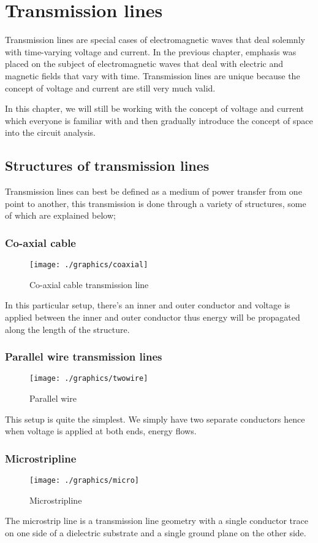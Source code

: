 \chapter{Transmission lines}\label{lec:lec2}
Transmission lines are special cases of electromagnetic waves that deal solemnly with time-varying voltage and current. In the previous chapter, emphasis was placed on the subject of electromagnetic waves that deal with electric and magnetic fields that vary with time. Transmission lines are unique because the concept of voltage and current are still very much valid.

In this chapter, we will still be working with the concept of voltage and current which everyone is familiar with and then gradually introduce the concept of space into the circuit analysis. 

\section{Structures of transmission lines}
Transmission lines can best be defined as a medium of power transfer from one point to another, this transmission is done through a variety of structures, some of which are explained below;

\subsection{Co-axial cable}	
\begin{figure}[h]
\centering
\texttt{[image: ./graphics/coaxial]}
\caption{Co-axial cable transmission line}
\end{figure}
 In this particular setup, there’s an inner and outer conductor and voltage is applied between the inner and outer conductor thus energy will be propagated along the length of the structure.
\subsection{Parallel wire transmission lines}
 \begin{figure}[h]
\centering
\texttt{[image: ./graphics/twowire]}
\caption{Parallel wire}
\end{figure}
This setup is quite the simplest. We simply have two separate conductors hence when voltage is applied at both ends, energy flows.
\subsection{Microstripline}
\begin{figure}[h]
\centering
\texttt{[image: ./graphics/micro]}
\caption{Microstripline }
\end{figure}
The microstrip line is a transmission line geometry with a single conductor trace on one side of a dielectric substrate and a single ground plane on the other side.

